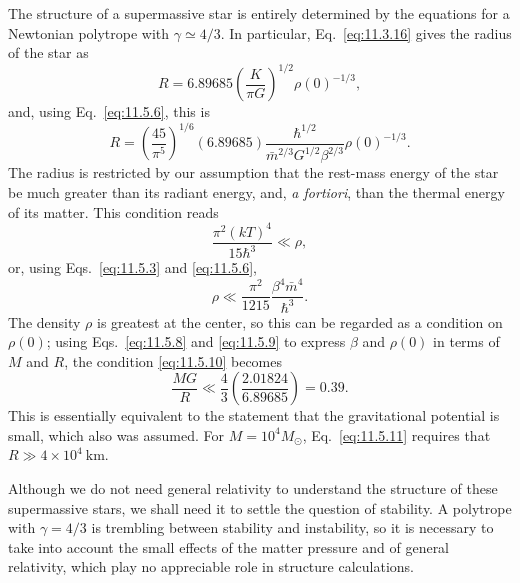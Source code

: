 The structure of a supermassive star is entirely determined by the equations
for a Newtonian polytrope with \(\gamma\simeq4/3\). In particular,
Eq.~\eqref{eq:11.3.16} gives the radius of the star as
\[
  R=6.89685\left(\frac K{\pi G}\right)^{1/2}\rho(0)^{-1/3},
\]
and, using Eq.~\eqref{eq:11.5.6}, this is
\begin{equation}
  R
  =
  \left(\frac{45}{\pi^5}\right)^{1/6}(6.89685)
  \frac{\hbar^{1/2}}
  {\bar m^{2/3}G^{1/2}\beta^{2/3}}
  \rho(0)^{-1/3}.
  \tag{11.5.9}\label{eq:11.5.9}
\end{equation}
The radius is restricted by our assumption that the rest-mass energy of the
star be much greater than its radiant energy, and, \emph{a fortiori}, than the
thermal energy of its matter. This condition reads
\[
  \frac{\pi^2(kT)^4}{15\hbar^3}\ll\rho,
\]
or, using Eqs.~\eqref{eq:11.5.3} and \eqref{eq:11.5.6},
\begin{equation}
  \rho\ll
  \frac{\pi^2}{1215}\frac{\beta^4\bar m^4}{\hbar^3}.
  \tag{11.5.10}\label{eq:11.5.10}
\end{equation}
The density \(\rho\) is greatest at the center, so this can be regarded as a
condition on \(\rho(0)\); using Eqs.~\eqref{eq:11.5.8} and
\eqref{eq:11.5.9} to express \(\beta\) and \(\rho(0)\) in terms of \(M\) and
\(R\), the condition \eqref{eq:11.5.10} becomes
\begin{equation}
  \frac{MG}{R}
  \ll
  \frac43\left(\frac{2.01824}{6.89685}\right)
  =
  0.39.
  \tag{11.5.11}\label{eq:11.5.11}
\end{equation}
This is essentially equivalent to the statement that the gravitational
potential is small, which also was assumed. For \(M=10^4M_\odot\),
Eq.~\eqref{eq:11.5.11} requires that \(R\gg4\times10^4\ \mathrm{km}\).

Although we do not need general relativity to understand the structure of
these supermassive stars, we shall need it to settle the question of stability.
A polytrope with \(\gamma=4/3\) is trembling between stability and
instability, so it is necessary to take into account the small effects of the
matter pressure and of general relativity, which play no appreciable role in
structure calculations.


